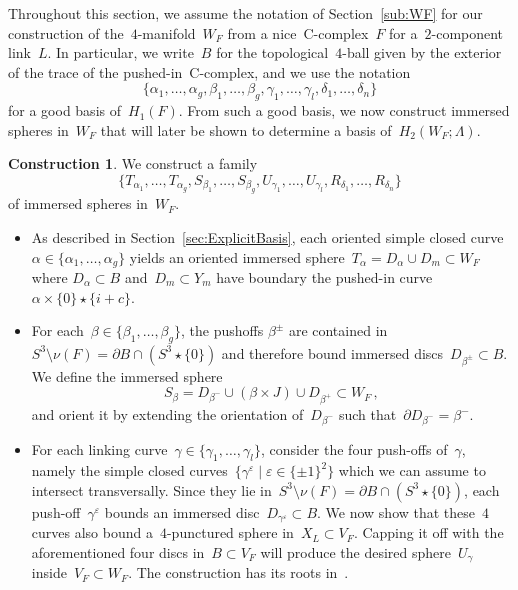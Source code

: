 \documentclass[10.9pt,a4paper]{amsart}
\theoremstyle{definition}
\newtheorem{construction}[theorem]{Construction}
\theoremstyle{remark}
\begin{document}
Throughout this section, we assume the notation of Section~\ref{sub:WF} for our construction of the~$4$-manifold~$W_F$ from a nice~C-complex~$F$ for a~$2$-component link~$L$. In particular, we write~$B$
for the topological~$4$-ball given by the exterior of the trace of the pushed-in~C-complex,
and we use the notation
\[
\{\alpha_1,\ldots,\alpha_{g}, \beta_1,\ldots,\beta_{g}, \gamma_1,\ldots,\gamma_l, \delta_1, \ldots, \delta_n\}
\]
for a good basis of~$H_1(F)$.
From such a good basis, we now construct immersed spheres in~$W_F$ that will later be shown to determine a basis of~$H_2(W_F;\Lambda)$.

\begin{construction}
We construct a family 
\[
\{T_{\alpha_1}, \ldots, T_{\alpha_{g}}, S_{\beta_1}, \ldots, S_{\beta_{g}}, U_{\gamma_1}, \ldots, U_{\gamma_l}, R_{\delta_1}, \ldots, R_{\delta_n}\}
\]
of immersed spheres in~$W_F$.
\begin{itemize}
\item
As described in Section~\ref{sec:ExplicitBasis}, each oriented simple closed curve~$\alpha\in\{\alpha_1,\dots,\alpha_g\}$ yields an oriented immersed sphere~$T_{\alpha} = D_{\alpha} \cup D_m\subset W_F$ where $D_\alpha \subset B$ and~$D_m \subset Y_m$ have boundary the pushed-in curve~$\alpha \times \{0\} \star \{i+c\}$.
\item
For each~$\beta\in\{\beta_1,\dots,\beta_g\}$, the pushoffs $\beta^\pm$ are contained in~$S^3\setminus\nu(F)=\partial B \cap (S^3 \star \{0\})$ and therefore bound immersed discs~$D_{\beta^\pm}\subset B$. We define the immersed sphere
\[
S_{\beta} = D_{\beta^-} \cup (\beta \times J) \cup D_{\beta^+}\subset W_F\,,
\]
and orient it by extending the orientation of~$D_{\beta^-}$ such that~$\partial D_{\beta^-}=\beta^{-}$.
\item For each linking curve~$\gamma\in\{\gamma_1,\dots,\gamma_l\}$, consider the four push-offs of~$\gamma$, namely the  simple closed curves~$\{\gamma^\varepsilon\mid \varepsilon\in\{\pm 1\}^2\}$ which we can assume to intersect transversally.
Since they lie in~$S^3\setminus\nu(F)=\partial B \cap (S^3 \star \{0\})$, each push-off~$\gamma^\varepsilon$ bounds an immersed disc~$D_{\gamma^\varepsilon}\subset B$.
We now show that these~$4$ curves also bound a~$4$-punctured sphere in~$X_L\subset V_F$. Capping it off with the
aforementioned four discs in~$B\subset V_F$ will produce the desired sphere~$U_{\gamma}$ inside~$V_F\subset W_F$.
The construction has its roots in~\cite[Section 4.1.1]{CFT18}.


\end{itemize}
\end{construction}
\end{document}
